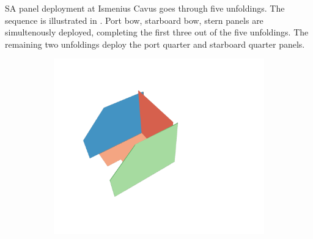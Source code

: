 \vspace{0.5cm}

\ac{SA} panel deployment at Ismenius Cavus goes through five unfoldings. The sequence is illustrated in . Port bow, starboard bow, stern panels are simultenously deployed, completing the first three out of the five unfoldings. The remaining two unfoldings deploy the port quarter and starboard quarter panels.

\vspace{0.5cm}

\begin{figure}[h]
\captionsetup[subfigure]{justification=centering}
\vspace{-2ex}
	\centering
    \setlength{\subfigureWidth}{0.32\textwidth}
    \setlength{\graphicsHeight}{30mm}
    \hypersetup{hidelinks=true}%
	\begin{subfigure}[t]{\subfigureWidth}
        \centering
		\includegraphics[height=\graphicsHeight]{sections/power-system-design/solar-array/images/deployment/ismenius-cavus/solar_array_deployment_ismenius_cavus_000.png}
		\label{fig:sub:deployment-sequence-ismenius-cavus-stowed}
	\end{subfigure}\hfill
	\begin{subfigure}[t]{\subfigureWidth}
        \centering

\end{subfigure}
\end{figure}
